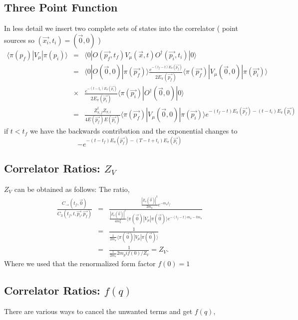 \documentclass[3p,preprint]{elsarticle}
\begin{document}
\subsection{Three Point Function}

In less detail we insert two complete sets of states into the correlator ( point sources so $(\vec{x_i}, t_i) = (\vec{0}, 0)$ )
\begin{eqnarray}
\langle \pi(p_f) | V_\mu | \pi(p_i) \rangle &=& \langle 0| O(\vec{p_f}, t_f) V_\mu(\vec{x}, t) O^\dagger(\vec{p_i}, t_i) |0\rangle \\
 &=& \langle 0| O(\vec{0}, 0) | \pi(\vec{p_f}) \rangle \frac{e^{-(t_f - t) E_\pi(\vec{p_f}) }}{2 E_\pi(\vec{p_f}) } \langle \pi(\vec{p_f}) | V_\mu(\vec{0}, 0) | \pi(\vec{p_i}) \rangle \\ &\times& \frac{e^{-(t - t_i) E_\pi(\vec{p_i}) }} {2 E_\pi(\vec{p_i}) } \langle \pi(\vec{p_i}) | O^\dagger(\vec{0}, 0) |0 \rangle \\ \nonumber
&=&  \frac{ Z_{\pi, f}^\dagger Z_{\pi, i} }{4 E(\vec{p_f}) E(\vec{p_i}) } \langle \pi(\vec{p_f}) | V_\mu(\vec{0}, 0) | \pi(\vec{p_i}) \rangle  e^{-(t_f - t) E_\pi(\vec{p_f}) -(t-t_i) E_\pi(\vec{p_i}) }
\end{eqnarray}
if $t < t_f$ we have the backwards contribution and the exponential changes to
\begin{equation}
-e^{-(t - t_f) E_\pi(\vec{p_f}) -(T - t + t_i) E_\pi(\vec{p_i}) }
\end{equation}

\subsection{Correlator Ratios: $Z_V$}
$Z_V$ can be obtained as follows: The ratio,
\begin{eqnarray}
\frac{ C_{\rightarrow}(t_f, \vec{0}) }{ C_3(t_f, t, \vec{p_i}, \vec{p_f}) } &=&
\frac{ \frac{ |Z_\pi( \vec{0} )|^2 }{ 2 m_\pi }   e^{- m_\pi t_f }  }{ \frac{ |Z_\pi( \vec{0} )|^2 }{4 m_\pi^2 } \langle \pi(\vec{0}) | V_\mu | \pi(\vec{0}) \rangle e^{-(t_f - t) m_\pi -t m_\pi } } \\
&=& \frac{ 1  }{ \frac{ 1 }{2 m_\pi } \langle \pi(\vec{0}) | V_\mu | \pi(\vec{0}) \rangle } \\
&=& \frac{ 1  }{ \frac{ 1 }{2 m_\pi } 2 m_pi f(0)/Z_V } = Z_V.
\end{eqnarray}
Where we used that the renormalized form factor $f(0) = 1$

\subsection{Correlator Ratios: $f(q)$}
There are various ways to cancel the unwanted terms and get $f(q)$,
\end{document}
